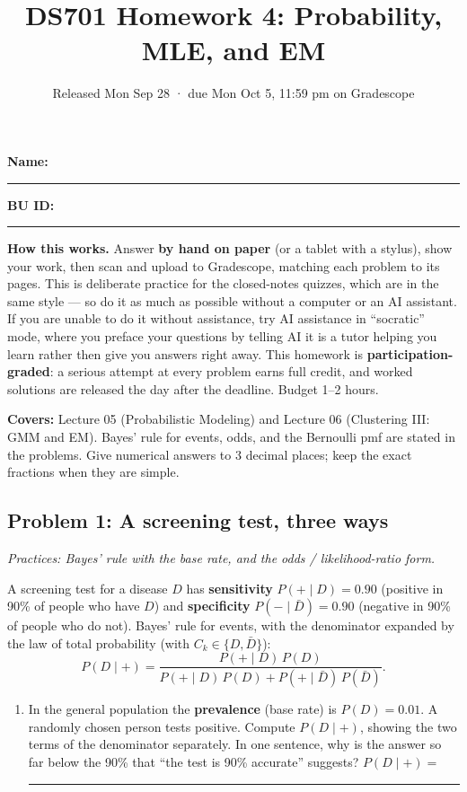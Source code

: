 \documentclass[
  11pt,
]{article}
\title{DS701 Homework 4: Probability, MLE, and EM}
\subtitle{Released Mon Sep 28 · due Mon Oct 5, 11:59 pm on Gradescope}
\author{}
\date{}
\providecommand{\tightlist}{%
  \setlength{\itemsep}{0pt}\setlength{\parskip}{0pt}}
\newcommand{\blank}[1][1.2in]{\rule{#1}{0.4pt}}
\begin{document}
\maketitle


\noindent\textbf{Name:}\ \rule{2.0in}{0.4pt}\qquad\textbf{BU ID:}\ \rule{1.2in}{0.4pt}
\vspace{6pt}

\textbf{How this works.} Answer \textbf{by hand on paper} (or a tablet
with a stylus), show your work, then scan and upload to Gradescope,
matching each problem to its pages. This is deliberate practice for the
closed-notes quizzes, which are in the same style --- so do it as much
as possible without a computer or an AI assistant. If you are unable to
do it without assistance, try AI assistance in ``socratic'' mode, where
you preface your questions by telling AI it is a tutor helping you learn
rather then give you answers right away. This homework is
\textbf{participation-graded}: a serious attempt at every problem earns
full credit, and worked solutions are released the day after the
deadline. Budget 1--2 hours.

\textbf{Covers:} Lecture 05 (Probabilistic Modeling) and Lecture 06
(Clustering III: GMM and EM). Bayes' rule for events, odds, and the
Bernoulli pmf are stated in the problems. Give numerical answers to 3
decimal places; keep the exact fractions when they are simple.

\subsection{Problem 1: A screening test, three
ways}\label{problem-1-a-screening-test-three-ways}

\emph{Practices: Bayes' rule with the base rate, and the odds /
likelihood-ratio form.}

A screening test for a disease \(D\) has \textbf{sensitivity}
\(P(+\mid D) = 0.90\) (positive in 90\% of people who have \(D\)) and
\textbf{specificity} \(P(-\mid \bar D) = 0.90\) (negative in 90\% of
people who do not). Bayes' rule for events, with the denominator
expanded by the law of total probability (with
\(C_k \in \{D, \bar D\}\)):
\[P(D\mid +) = \frac{P(+\mid D)\,P(D)}{P(+\mid D)\,P(D) + P(+\mid \bar D)\,P(\bar D)} .\]

\begin{enumerate}
\def\labelenumi{(\alph{enumi})}
\tightlist
\item
  In the general population the \textbf{prevalence} (base rate) is
  \(P(D) = 0.01\). A randomly chosen person tests positive. Compute
  \(P(D\mid +)\), showing the two terms of the denominator separately.
  In one sentence, why is the answer so far below the 90\% that ``the
  test is 90\% accurate'' suggests? \(P(D\mid +) =\) \blank[0.8in]
\end{enumerate}
\end{document}

